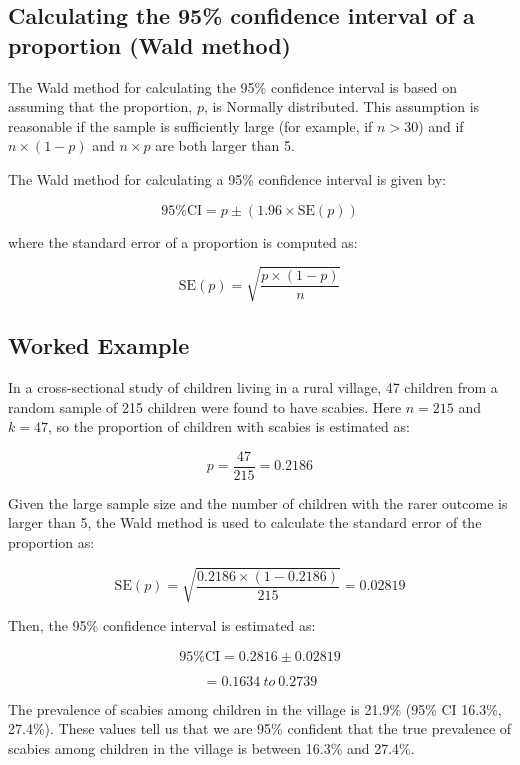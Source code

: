 \documentclass[
]{memoir}
\begin{document}
\hypertarget{calculating-the-95-confidence-interval-of-a-proportion-wald-method}{%
\subsection{Calculating the 95\% confidence interval of a proportion (Wald method)}\label{calculating-the-95-confidence-interval-of-a-proportion-wald-method}}

The Wald method for calculating the 95\% confidence interval is based on assuming that the proportion, \(p\), is Normally distributed. This assumption is reasonable if the sample is sufficiently large (for example, if \(n>30\)) and if \(n \times (1-p)\) and \(n \times p\) are both larger than 5.

The Wald method for calculating a 95\% confidence interval is given by:

\[\text{95\% CI} = p \pm (1.96 \times \text{SE}(p))\]

where the standard error of a proportion is computed as:

\[\text{SE}(p) = \sqrt{\frac{p \times (1 - p)}{n}}\]

\hypertarget{worked-example-1}{%
\subsection{Worked Example}\label{worked-example-1}}

In a cross-sectional study of children living in a rural village, 47 children from a random sample of 215 children were found to have scabies. Here \(n=215\) and \(k=47\), so the proportion of children with scabies is estimated as:

\[ p = \frac{47}{215} = 0.2186 \]

Given the large sample size and the number of children with the rarer outcome is larger than 5, the Wald method is used to calculate the standard error of the proportion as:

\[{\text{SE}\left( p \right) = \sqrt{\frac{0.2186 \times (1 - 0.2186)}{215}}
}{= 0.02819}\]

Then, the 95\% confidence interval is estimated as:

\[\text{95\% CI} = 0.2816 \pm 0.02819\]

\[= 0.1634\ to\ 0.2739\]

The prevalence of scabies among children in the village is 21.9\% (95\% CI 16.3\%, 27.4\%). These values tell us that we are 95\% confident that the true prevalence of scabies among children in the village is between 16.3\% and 27.4\%.
\end{document}
